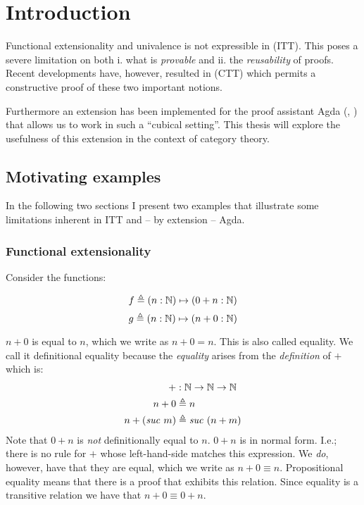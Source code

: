 \chapter{Introduction}
Functional extensionality and univalence is not expressible in
 (ITT). This poses a severe limitation
on both i. what is \emph{provable} and ii. the \emph{reusability} of proofs.
Recent developments have, however, resulted in  (CTT)
which permits a constructive proof of these two important notions.

Furthermore an extension has been implemented for the proof assistant Agda
(\cite{agda}, \cite{cubical-agda}) that allows us to work in such a ``cubical
setting''. This thesis will explore the usefulness of this extension in the
context of category theory.
%
\section{Motivating examples}
%
In the following two sections I present two examples that illustrate some
limitations inherent in ITT and -- by extension -- Agda.
%
\subsection{Functional extensionality}
Consider the functions:
%
\begin{multicols}{2}
  \noindent
  \begin{equation*}
    f \mathrel{\triangleq} (n : \mathbb{N}) \mapsto (0 + n : \mathbb{N})
  \end{equation*}
  \begin{equation*}
    g \mathrel{\triangleq} (n : \mathbb{N}) \mapsto (n + 0 : \mathbb{N})
  \end{equation*}
\end{multicols}
%
$n + 0$ is  equal to $n$, which we write as $n + 0 = n$.
This is also called  equality. We call it definitional
equality because the \emph{equality} arises from the \emph{definition} of $+$
which is:
%
\newcommand{\suc}[1]{\mathit{suc}\ #1}
\begin{align*}
  +           & : \bN \to \bN \to \bN      \\
  n + 0       & \defeq n                   \\
  n + (\suc{m}) & \defeq \suc{(n + m)}
\end{align*}
%
Note that $0 + n$ is \emph{not} definitionally equal to $n$. $0 + n$ is in
normal form. I.e.; there is no rule for $+$ whose left-hand-side matches this
expression. We \emph{do}, however, have that they are 
equal, which we write as $n + 0 \equiv n$. Propositional equality means that
there is a proof that exhibits this relation. Since equality is a transitive
relation we have that $n + 0 \equiv 0 + n$.

